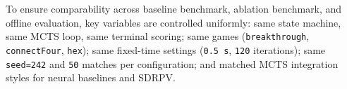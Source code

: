 To ensure comparability across baseline benchmark, ablation benchmark, and offline evaluation, key variables are controlled uniformly: same state machine, same MCTS loop, same terminal scoring; same games (\texttt{breakthrough}, \texttt{connectFour}, \texttt{hex}); same fixed-time settings (\texttt{0.5 s}, \texttt{120} iterations); same \texttt{seed=242} and \texttt{50} matches per configuration; and matched MCTS integration styles for neural baselines and SDRPV.









